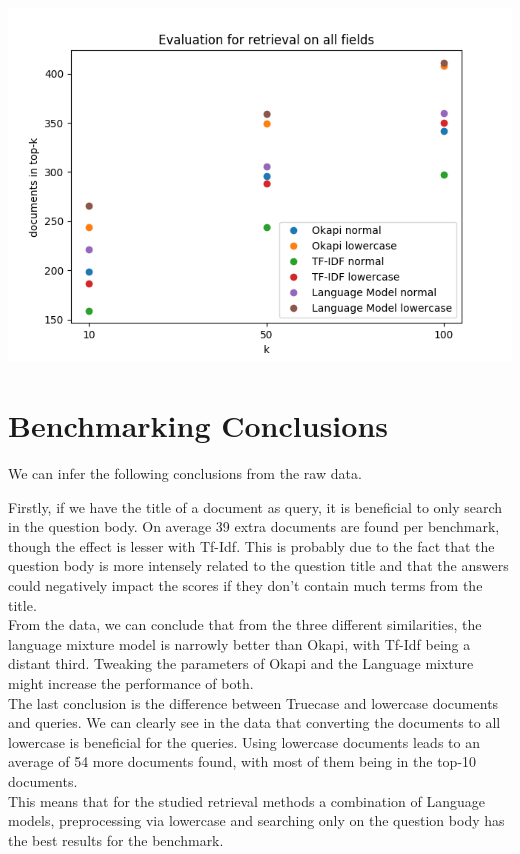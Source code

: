\documentclass{article}
\begin{document}
\includegraphics[width=\textwidth]{all_fields}

\section{Benchmarking Conclusions}
We can infer the following conclusions from the raw data. 

Firstly, if we have the title of a document as query, it is beneficial to only search in the question body. On average 39 extra documents are found per benchmark, though the effect is lesser with Tf-Idf. This is probably due to the fact that the question body is more intensely related to the question title and that the answers could negatively impact the scores if they don't contain much terms from the title.\\

From the data, we can conclude that from the three different similarities, the language mixture model is narrowly better than Okapi, with Tf-Idf being a distant third. Tweaking the parameters of Okapi and the Language mixture might increase the performance of both.\\

The last conclusion is the difference between Truecase and lowercase documents and queries. We can clearly see in the data that converting the documents to all lowercase is beneficial for the queries. Using lowercase documents leads to an average of 54 more documents found, with most of them being in the top-10 documents.\\
 
This means that for the studied retrieval methods a combination of Language models, preprocessing via lowercase and searching only on the question body has the best results for the benchmark. \\
\end{document}
